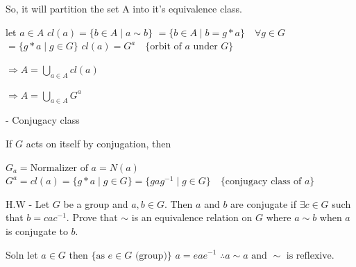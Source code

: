 So, it will partition the set A into it's equivalence class.

let $a \in A$
$cl(a) = \{b \in A \mid a \sim b\}$
$= \{b \in A \mid b = g * a\} \quad \forall g \in G$
$= \{g * a \mid g \in G\}$
$cl(a) = G^a \quad \{\text{orbit of } a \text{ under } G\}$

$\Rightarrow A = \bigcup_{a \in A} cl(a)$

$\Rightarrow A = \bigcup_{a \in A} G^a$

- Conjugacy class

If $G$ acts on itself by conjugation, then

$G_a = \text{Normalizer of } a = N(a)$
$G^a = cl(a) = \{g * a \mid g \in G\} = \{gag^{-1} \mid g \in G\} \quad \{\text{conjugacy class of } a\}$

H.W
- Let $G$ be a group and $a, b \in G$. Then $a$ and $b$ are conjugate if $\exists c \in G$ such that $b = cac^{-1}$. Prove that $\sim$ is an equivalence relation on $G$ where $a \sim b$ when $a$ is conjugate to $b$.

Soln
let $a \in G$ then $\{\text{as } e \in G \text{ (group)}\}$
$a = e a e^{-1}$
$\therefore a \sim a \text{ and } \sim \text{ is reflexive.}$
